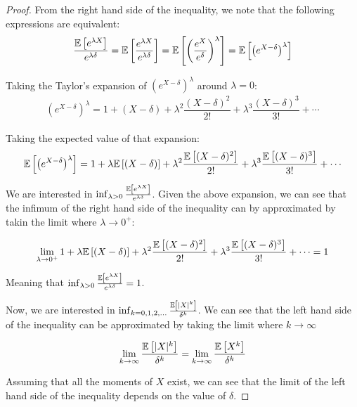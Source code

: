 \begin{proof}
From the right hand side of the inequality, we note that the following expressions are equivalent:
\begin{align*}
\frac{\mathbb{E}\left[e^{\lambda X}\right]}{e^{\lambda \delta}} = 
\mathbb{E}\left[\frac{e^{\lambda X}}{e^{\lambda \delta}}\right] =
\mathbb{E}\left[\left(\frac{e^{X}}{e^{\delta}}\right)^{\lambda}\right] = 
\mathbb{E}\left[\left(e^{X - \delta}\right)^{\lambda}\right]
\end{align*}

Taking the Taylor's expansion of $\left(e^{X - \delta}\right)^{\lambda}$ around $\lambda = 0$:
\begin{align*}
\left(e^{X - \delta}\right)^{\lambda} = 1 + (X - \delta) + \lambda^2 \dfrac{(X - \delta)^2}{2!}
+ \lambda^3 \dfrac{(X - \delta)^3}{3!} + \cdots
\end{align*}

Taking the expected value of that expansion:
\begin{align*}
\mathbb{E}\left[\left(e^{X - \delta}\right)^{\lambda}\right] = 1 + \lambda \mathbb{E}\left[(X - \delta)\right] + \lambda^2 \dfrac{\mathbb{E}\left[(X - \delta)^2\right]}{2!}
+ \lambda^3 \dfrac{\mathbb{E}\left[(X - \delta)^3\right]}{3!} + \cdots
\end{align*}

We are interested in $\inf_{\lambda>0} \frac{\mathbb{E}\left[e^{\lambda X}\right]}{e^{\lambda \delta}}$. Given the above expansion, we can see that the infimum of the right hand side of the inequality can by approximated by takin the limit where $\lambda \to 0^+$:

\begin{align*}
\lim_{\lambda \to 0^+} 1 + \lambda \mathbb{E}\left[(X - \delta)\right] + \lambda^2 \dfrac{\mathbb{E}\left[(X - \delta)^2\right]}{2!}
+ \lambda^3 \dfrac{\mathbb{E}\left[(X - \delta)^3\right]}{3!} + \cdots = 1
\end{align*}

Meaning that $\inf_{\lambda>0} \frac{\mathbb{E}\left[e^{\lambda X}\right]}{e^{\lambda \delta}} = 1$.

Now, we are interested in $\inf_{k=0,1,2,\ldots} \frac{\mathbb{E}\left[|X|^k\right]}{\delta^k}$. We can see that the left hand side of the inequality can be approximated by taking the limit where $k \to \infty$

\begin{align*}
\lim_{k \to \infty} \frac{\mathbb{E}\left[|X|^k\right]}{\delta^k} = \lim_{k \to \infty} \frac{\mathbb{E}\left[X^k\right]}{\delta^k}
\end{align*}

Assuming that all the moments of $X$ exist, we can see that the limit of the left hand side of the inequality depends on the value of $\delta$. 


\end{proof}
